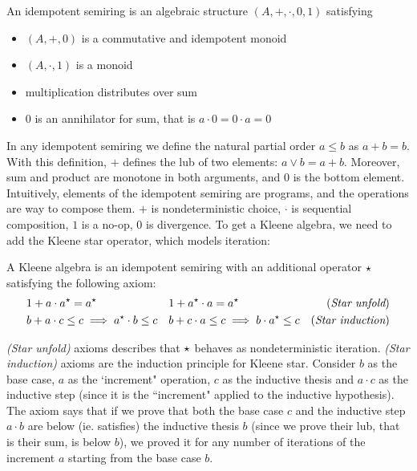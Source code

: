 \begin{definition}\label{def:bg:i-semiring}
	An idempotent semiring is an algebraic structure $(A, +, \cdot, 0, 1)$ satisfying
	\begin{itemize}
		\item $(A, +, 0)$ is a commutative and idempotent monoid
		\item $(A, \cdot, 1)$ is a monoid
		\item multiplication distributes over sum
		\item $0$ is an annihilator for sum, that is $a \cdot 0 = 0 \cdot a = 0$
	\end{itemize}
\end{definition}
In any idempotent semiring we define the natural partial order $a \le b$ as $a + b = b$. With this definition, $+$ defines the lub of two elements: $a \vee b = a + b$. Moreover, sum and product are monotone in both arguments, and $0$ is the bottom element.
Intuitively, elements of the idempotent semiring are programs, and the operations are way to compose them. $+$ is nondeterministic choice, $\cdot$ is sequential composition, $1$ is a no-op, $0$ is divergence. To get a Kleene algebra, we need to add the Kleene star operator, which models iteration:
\begin{definition}\label{def:bg:kleene-algebra}
	A Kleene algebra is an idempotent semiring with an additional operator $\star$ satisfying the following axiom:
	\begin{align*}
		&1 + a \cdot a^\star = a^\star
		&&1 + a^\star \cdot a = a^\star &(\textit{Star unfold})\\
		&b + a \cdot c \le c \implies a^\star \cdot b \le c
		&&b + c \cdot a \le c \implies b \cdot a^\star \le c &(\textit{Star induction})
	\end{align*}
\end{definition}
\textit{(Star unfold)} axioms describes that $\star$ behaves as nondeterministic iteration. \textit{(Star induction)} axioms are the induction principle for Kleene star. Consider $b$ as the base case, $a$ as the `increment" operation, $c$ as the inductive thesis and $a \cdot c$ as the inductive step (since it is the ``increment" applied to the inductive hypothesis). The axiom says that if we prove that both the base case $c$ and the inductive step $a \cdot b$ are below (ie. satisfies) the inductive thesis $b$ (since we prove their lub, that is their sum, is below $b$), we proved it for any number of iterations of the increment $a$ starting from the base case $b$.

